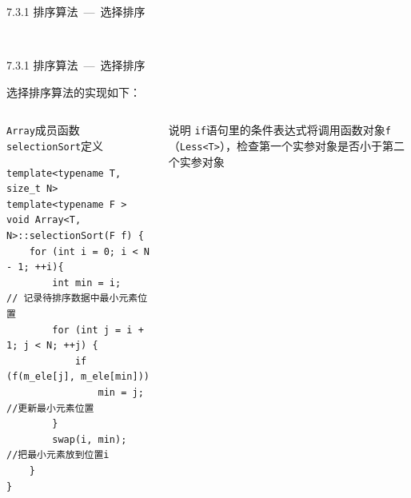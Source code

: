 \begin{frame}[fragile]{7.3.1 排序算法\normalsize{~---~选择排序}}
\begin{center}
\\
\end{center}

\end{frame}


\begin{frame}[fragile]{7.3.1 排序算法\normalsize{~---~选择排序}}

选择排序算法的实现如下：

\vspace{-4mm}

\begin{columns}[t]

\begin{blueblock}{\texttt{Array}成员函数\texttt{selectionSort}定义}
\begin{lstlisting}[moreemph={Array,T,F}]
template<typename T, size_t N>
template<typename F >
void Array<T, N>::selectionSort(F f) {
    for (int i = 0; i < N - 1; ++i){
        int min = i;        // 记录待排序数据中最小元素位置
        for (int j = i + 1; j < N; ++j) {
            if (f(m_ele[j], m_ele[min]))
                min = j;    //更新最小元素位置
        }
        swap(i, min);       //把最小元素放到位置i
    }
}
\end{lstlisting}
\end{blueblock}

\begin{yellowblock}{说明}
\texttt{if}语句里的条件表达式将调用函数对象\texttt{f}（\texttt{Less<T>}），检查第一个实参对象是否小于第二个实参对象
\end{yellowblock}

\end{columns}

\end{frame}


